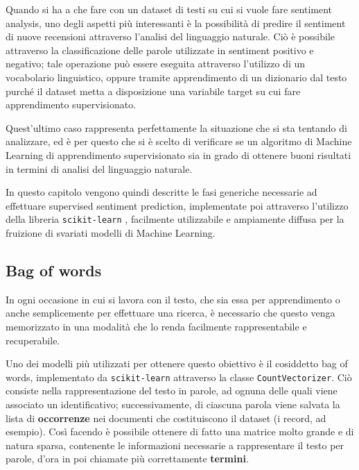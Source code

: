 \documentclass[hidelinks, 12pt]{article}
\begin{document}
Quando si ha a che fare con un dataset di testi su cui si vuole fare sentiment analysis, uno degli aspetti più interessanti è la possibilità di predire il sentiment di nuove recensioni attraverso l'analisi del linguaggio naturale. Ciò è possibile attraverso la classificazione delle parole utilizzate in sentiment positivo e negativo; tale operazione può essere eseguita attraverso l'utilizzo di un vocabolario linguistico, oppure tramite apprendimento di un dizionario dal testo purché il dataset metta a disposizione una variabile target su cui fare apprendimento supervisionato.

Quest'ultimo caso rappresenta perfettamente la situazione che si sta tentando di analizzare, ed è per questo che si è scelto di verificare se un algoritmo di Machine Learning di apprendimento supervisionato sia in grado di ottenere buoni risultati in termini di analisi del linguaggio naturale.

In questo capitolo vengono quindi descritte le fasi generiche necessarie ad effettuare supervised sentiment prediction, implementate poi attraverso l'utilizzo della libreria \texttt{scikit-learn} \cite{site:sklearn}, facilmente utilizzabile e ampiamente diffusa per la fruizione di svariati modelli di Machine Learning.



\subsection{Bag of words}


In ogni occasione in cui si lavora con il testo, che sia essa per apprendimento o anche semplicemente per effettuare una ricerca, è necessario che questo venga memorizzato in una modalità che lo renda facilmente rappresentabile e recuperabile.

Uno dei modelli più utilizzati per ottenere questo obiettivo è il cosiddetto bag of words, implementato da \texttt{scikit-learn} attraverso la classe \texttt{CountVectorizer}. Ciò consiste nella rappresentazione del testo in parole, ad ognuna delle quali viene associato un identificativo; successivamente, di ciascuna parola viene salvata la lista di \textbf{occorrenze} nei documenti che costituiscono il dataset (i record, ad esempio). Così facendo è possibile ottenere di fatto una matrice molto grande e di natura sparsa, contenente le informazioni necessarie a rappresentare il testo per parole, d'ora in poi chiamate più correttamente \textbf{termini}.


\pagebreak
\end{document}
